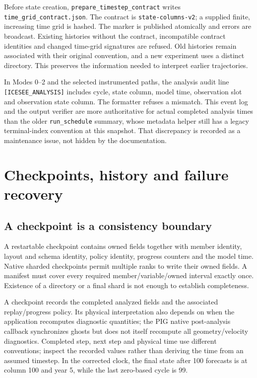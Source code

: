 \documentclass[11pt,a4paper]{article}
\newcommand{\code}[1]{\nolinkurl{#1}}
\begin{document}
Before state creation, \code{prepare_timestep_contract} writes \code{time_grid_contract.json}. The contract is \code{state-columns-v2}; a supplied finite, increasing time grid is hashed. The marker is published atomically and errors are broadcast. Existing histories without the contract, incompatible contract identities and changed time-grid signatures are refused. Old histories remain associated with their original convention, and a new experiment uses a distinct directory. This preserves the information needed to interpret earlier trajectories.

In Modes 0--2 and the selected instrumented paths, the analysis audit line \code{[ICESEE_ANALYSIS]} includes cycle, state column, model time, observation slot and observation state column. The formatter refuses a mismatch. This event log and the output verifier are more authoritative for actual completed analysis times than the older \code{run_schedule} summary, whose metadata helper still has a legacy terminal-index convention at this snapshot. That discrepancy is recorded as a maintenance issue, not hidden by the documentation.

\section{Checkpoints, history and failure recovery}
\subsection{A checkpoint is a consistency boundary}
A restartable checkpoint contains owned fields together with member identity, layout and schema identity, policy identity, progress counters and the model time. Native sharded checkpoints permit multiple ranks to write their owned fields. A manifest must cover every required member/variable/owned interval exactly once. Existence of a directory or a final shard is not enough to establish completeness.

A checkpoint records the completed analyzed fields and the associated replay/progress policy. Its physical interpretation also depends on when the application recomputes diagnostic quantities; the PIG native post-analysis callback synchronizes ghosts but does not itself recompute all geometry/velocity diagnostics. Completed step, next step and physical time use different conventions; inspect the recorded values rather than deriving the time from an assumed timestep. In the corrected clock, the final state after 100 forecasts is at column 100 and year 5, while the last zero-based cycle is 99.
\end{document}
